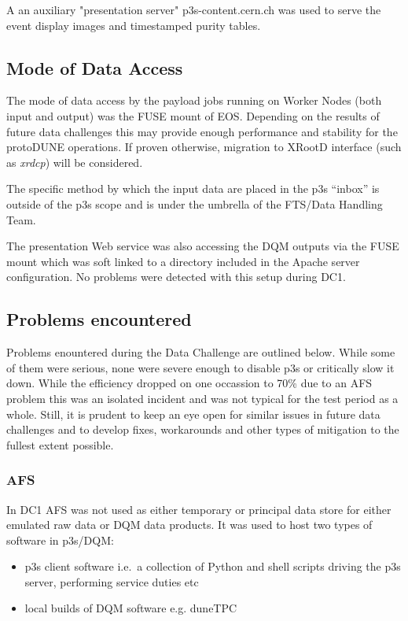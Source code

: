 \documentclass[pdftex,12pt,letter]{article}
\newcommand{\pd}{protoDUNE\xspace}
\begin{document}
\noindent  A an auxiliary "presentation server" p3s-content.cern.ch
was used to serve the event display images and timestamped purity tables.

\subsection{Mode of Data Access}
The mode of data access by the payload jobs running on Worker Nodes (both input and output) was the FUSE mount of EOS.
Depending on the results of future data challenges this may provide enough performance and
stability for the \pd operations. If proven otherwise, migration to XRootD interface (such as \textit{xrdcp})
will be considered.

The specific method by which the input data are placed in the p3s ``inbox'' is outside of the p3s scope and is
under the umbrella of the FTS/Data Handling Team.

The presentation Web service was also accessing the DQM outputs via the FUSE mount which was 
soft linked to a directory included in the Apache server configuration. No problems were detected
with this setup during DC1.



\subsection{Problems encountered}
\label{sec:p3s_issues}
Problems enountered during the Data Challenge are outlined below. While some of them were serious, none
were severe enough to disable p3s or critically slow it down. While the efficiency dropped on one occassion to 70\% due to an AFS problem
this was an isolated incident and was not typical for the test period as a whole. Still, it is prudent to keep an eye
open for similar issues in future data challenges and to develop fixes, workarounds and other types of mitigation
to the fullest extent possible.

\subsubsection{AFS}

In DC1 AFS was not used as either temporary or principal data store for either emulated raw data or DQM data products.
It was used to host two types of software in p3s/DQM:
\begin{itemize}
\item p3s client software i.e.~a collection of Python and shell scripts driving the p3s server, performing service duties etc
\item local builds of DQM software e.g. duneTPC
\end{itemize}
\end{document}
